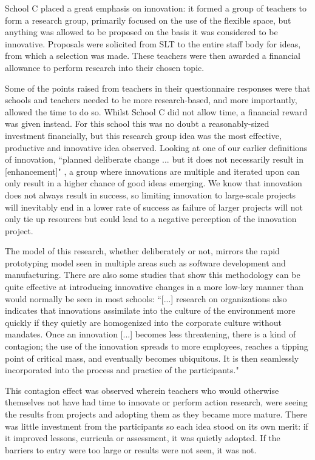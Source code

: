 \documentclass[11pt]{article}
\begin{document}
School C placed a great emphasis on innovation: it formed a group of teachers to form a research group, primarily focused on the use of the flexible space, but anything was allowed to be proposed on the basis it was considered to be innovative. Proposals were solicited from SLT to the entire staff body for ideas, from which a selection was made. These teachers were then awarded a financial allowance to perform research into their chosen topic. 

Some of the points raised from teachers in their questionnaire responses were that schools and teachers needed to be more research-based, and more importantly, allowed the time to do so. Whilst School C did not allow time, a financial reward was given instead. For this school this was no doubt a reasonably-sized investment financially, but this research group idea was the most effective, productive and innovative idea observed. Looking at one of our earlier definitions of innovation, ``planned deliberate change ... but it does not necessarily result in [enhancement]" \citep{hannan2002innovative}, a group where innovations are multiple and iterated upon can only result in a higher chance of good ideas emerging. We know that innovation does not always result in success, so limiting innovation to large-scale projects will inevitably end in a lower rate of success as failure of larger projects will not only tie up resources but could lead to a negative perception of the innovation project.

The model of this research, whether deliberately or not, mirrors the rapid prototyping model seen in multiple areas such as software development and manufacturing. There are also some studies that show this methodology can be quite effective at introducing innovative changes in a more low-key manner than would normally be seen in most schools: ``[...] research on organizations also indicates that innovations assimilate into the culture of the environment more quickly if they quietly are homogenized into the corporate culture without mandates. Once an innovation [...] becomes less threatening, there is a kind of contagion; the use of the innovation spreads to more employees, reaches a tipping point of critical mass, and eventually becomes ubiquitous. It is then seamlessly incorporated into the process and practice of the participants." \citep{cook2008combining}

This contagion effect was observed wherein teachers who would otherwise themselves not have had time to innovate or perform action research, were seeing the results from projects and adopting them as they became more mature. There was little investment from the participants so each idea stood on its own merit: if it improved lessons, curricula or assessment, it was quietly adopted. If the barriers to entry were too large or results were not seen, it was not.
\end{document}
